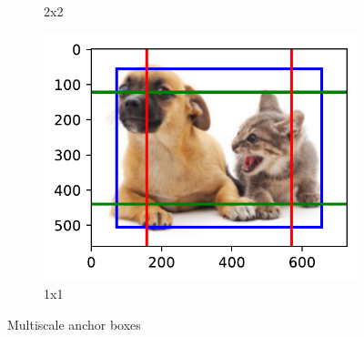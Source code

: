 \documentclass{article}
\begin{document}
\begin{figure}[ht!]
\begin{subfigure}[b]{0.45\linewidth}
        \caption{2x2}
        \label{fig5b}
    \end{subfigure}
        \begin{subfigure}[b]{0.45\linewidth}
        \includegraphics[width = \linewidth]{output_multiscale-object-detection_ad7147_39_0.pdf}
        \caption{1x1}
        \label{fig5c}
    \end{subfigure}
    \label{fig5}
    \caption{Multiscale anchor boxes}
\end{figure}
\end{document}
